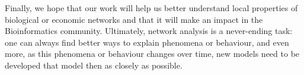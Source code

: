 Finally, we hope that our work will help us better understand local properties
of biological or economic networks and that it will make an impact in the
Bioinformatics community. Ultimately, network analysis is a never-ending task:
one can always find better ways to explain phenomena or behaviour, and even
more, as this phenomena or behaviour changes over time, new models need to be
developed that model then as closely as possible.
